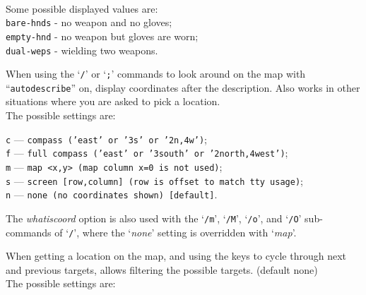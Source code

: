 \documentclass[titlepage]{article}
\begin{document}
\begin{description}[font=\mdseries\itshape]
\\
Some possible displayed values are:
\\
\texttt{bare-hnds} - no weapon and no gloves;\\
\texttt{empty-hnd} - no weapon but gloves are worn;\\
\texttt{dual-weps} - wielding two weapons.
\item[whatis\textunderscore coord]
When using the `\texttt{/}' or `\texttt{;}' commands to look around on the map with
``\texttt{autodescribe}''
on, display coordinates after the description.
Also works in other situations where you are asked to pick a location.\\

The possible settings are:

\texttt{c} --- \texttt{compass ('east' or '3s' or '2n,4w')};\\
\texttt{f} --- \texttt{full compass ('east' or '3south' or '2north,4west')};\\
\texttt{m} --- \texttt{map <x,y> (map column x=0 is not used)};\\
\texttt{s} --- \texttt{screen [row,column] (row is offset to match tty usage)};\\
\texttt{n} --- \texttt{none (no coordinates shown) [default]}.

The
\textit{whatis\textunderscore coord}
option is also used with
the `\texttt{/m}', `\texttt{/M}', `\texttt{/o}', and `\texttt{/O}' sub-commands
of `\texttt{/}',
where the `\textit{none}' setting is overridden with `\textit{map}'.
\item[whatis\textunderscore filter]
When getting a location on the map, and using the keys to cycle through
next and previous targets, allows filtering the possible targets.
(default none)\\
The possible settings are:


\end{description}
\end{document}
